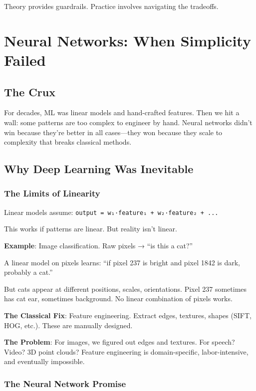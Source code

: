 \documentclass[11pt,oneside]{book}
\newcommand{\blankpage}{%
    \clearpage
    \thispagestyle{empty}
    \mbox{}
    \clearpage
}
\begin{document}
Theory provides guardrails. Practice involves navigating the tradeoffs.

\blankpage


\chapter{Neural Networks: When Simplicity Failed}

\section{The Crux}
For decades, ML was linear models and hand-crafted features. Then we hit a wall: some patterns are too complex to engineer by hand. Neural networks didn't win because they're better in all cases---they won because they scale to complexity that breaks classical methods.

\section{Why Deep Learning Was Inevitable}

\subsection{The Limits of Linearity}

Linear models assume: \texttt{output = w₁·feature₁ + w₂·feature₂ + ...}

This works if patterns are linear. But reality isn't linear.

\textbf{Example}: Image classification. Raw pixels → ``is this a cat?''

A linear model on pixels learns: ``if pixel 237 is bright and pixel 1842 is dark, probably a cat.''

But cats appear at different positions, scales, orientations. Pixel 237 sometimes has cat ear, sometimes background. No linear combination of pixels works.

\textbf{The Classical Fix}: Feature engineering. Extract edges, textures, shapes (SIFT, HOG, etc.). These are manually designed.

\textbf{The Problem}: For images, we figured out edges and textures. For speech? Video? 3D point clouds? Feature engineering is domain-specific, labor-intensive, and eventually impossible.

\subsection{The Neural Network Promise}
\end{document}
